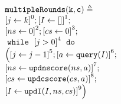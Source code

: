\begin{example}
{%
}
\end{example}

%
\begin{figure}
\centering
\begin{subfigure}{0.25\textwidth}
    \small{
    $
\begin{array}{l}
\kw{multipleRounds(k, c)} \triangleq\\
    \clabel{\assign{j}{k}}^0;
    \clabel{\assign{I}{[]}}^1; \\
    \clabel{\assign{ns}{0}}^2; 
    \clabel{\assign{cs}{0}}^3; \\
    \ewhile ~ \clabel{j > 0}^{4} ~ \edo ~ \\
    \Big(
    \clabel{\assign{j}{j-1}}^{5} ;
    \clabel{\assign{a}{\query(I)}}^6; \\
    \clabel{\assign{ns}{\kw{updnscore}(ns, a)}}^7; \\
    \clabel{\assign{cs}{\kw{updcscore}(cs, a)}}^8; \\
    \clabel{\assign{I}{\kw{updI}(I, ns, cs)}}^9
    \Big) 
\end{array}
    $
    }
    \caption{}
\end{subfigure}
%

\end{figure}
